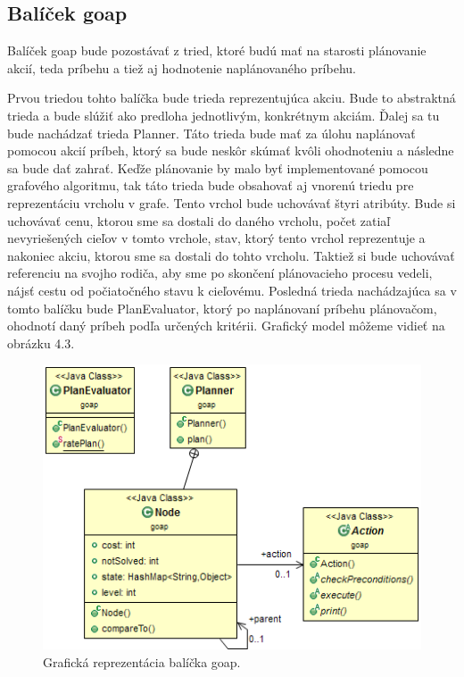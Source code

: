\subsection{Balíček goap}
Balíček goap bude pozostávať z tried, ktoré budú mať na starosti plánovanie akcií, teda príbehu a tiež aj hodnotenie naplánovaného príbehu.\par
Prvou triedou tohto balíčka bude trieda reprezentujúca akciu. Bude to abstraktná trieda a bude slúžiť ako predloha jednotlivým, konkrétnym akciám. Ďalej sa tu bude nachádzať trieda Planner. Táto trieda bude mať za úlohu naplánovať pomocou akcií príbeh, ktorý sa bude neskôr skúmať kvôli ohodnoteniu a následne sa bude dať zahrať. Keďže plánovanie by malo byť implementované pomocou grafového algoritmu, tak táto trieda bude obsahovať aj vnorenú triedu pre reprezentáciu vrcholu v grafe. Tento vrchol bude uchovávať štyri atribúty. Bude si uchovávať cenu, ktorou sme sa dostali do daného vrcholu, počet zatiaľ nevyriešených cieľov v tomto vrchole, stav, ktorý tento vrchol reprezentuje a nakoniec akciu, ktorou sme sa dostali do tohto vrcholu. Taktiež si bude uchovávať referenciu na svojho rodiča, aby sme po skončení plánovacieho procesu vedeli, nájsť cestu od počiatočného stavu k cieľovému. Posledná trieda nachádzajúca sa v tomto balíčku bude PlanEvaluator, ktorý po naplánovaní príbehu plánovačom, ohodnotí daný príbeh podľa určených kritérii. Grafický model môžeme vidieť na obrázku 4.3.
\begin{figure}[H] 
\begin{center}
\includegraphics[scale=0.9]{img/goap.png}
\caption{Grafická reprezentácia balíčka goap.}
\label{fig:ch43}
\end{center}
\end{figure}
